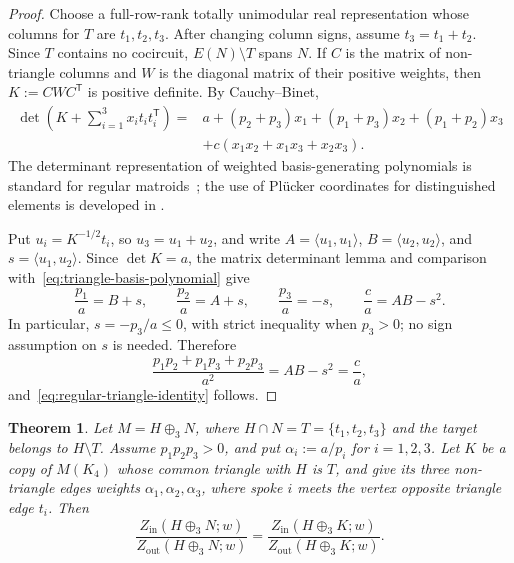 \documentclass[11pt]{article}
\numberwithin{equation}{section}
\newtheorem{theorem}[definition]{Theorem}
\theoremstyle{remark}
\begin{document}
\begin{proof}
Choose a full-row-rank totally unimodular real representation whose columns for $T$ are
$t_1,t_2,t_3$. After changing column signs, assume $t_3=t_1+t_2$. Since $T$
contains no cocircuit, $E(N)\setminus T$ spans $N$. If $C$ is the matrix of
non-triangle columns and $W$ is the diagonal matrix of their positive
weights, then $K:=CWC^{\mathsf T}$ is positive definite. By Cauchy--Binet,
\begin{equation}
\begin{aligned}
    \det\!\left(K+\sum_{i=1}^3x_it_it_i^{\mathsf T}\right)
    ={}&a
      +(p_2+p_3)x_1+(p_1+p_3)x_2+(p_1+p_2)x_3\\
     &+c(x_1x_2+x_1x_3+x_2x_3).
    \label{eq:triangle-basis-polynomial}
\end{aligned}
\end{equation}
The determinant representation of weighted basis-generating polynomials is
standard for regular matroids~\cite{ChoeOxleySokalWagner2004}; the use of
Pl\"ucker coordinates for distinguished elements is developed in
\cite{Chaiken2006PortedTutte}.

Put $u_i=K^{-1/2}t_i$, so $u_3=u_1+u_2$, and write
$A=\langle u_1,u_1\rangle$, $B=\langle u_2,u_2\rangle$, and
$s=\langle u_1,u_2\rangle$. Since $\det K=a$, the matrix determinant lemma
and comparison with~\eqref{eq:triangle-basis-polynomial} give
\begin{equation}
    \frac{p_1}{a}=B+s,
    \qquad
    \frac{p_2}{a}=A+s,
    \qquad
    \frac{p_3}{a}=-s,
    \qquad
    \frac{c}{a}=AB-s^2.
\end{equation}
In particular, $s=-p_3/a\leq0$, with strict inequality when $p_3>0$;
no sign assumption on $s$ is needed. Therefore
\begin{equation}
    \frac{p_1p_2+p_1p_3+p_2p_3}{a^2}
    =AB-s^2
    =\frac ca,
\end{equation}
and~\eqref{eq:regular-triangle-identity} follows.
\end{proof}

\begin{theorem}
\label{thm:seymour-three-sum}
Let $M=H\oplus_3N$, where $H\cap N=T=\{t_1,t_2,t_3\}$ and the target
belongs to $H\setminus T$. Assume $p_1p_2p_3>0$, and put
$\alpha_i:=a/p_i$ for $i=1,2,3$. Let $K$ be a copy of $M(K_4)$ whose common
triangle with $H$ is $T$, and give its three non-triangle edges weights
$\alpha_1,\alpha_2,\alpha_3$, where spoke $i$ meets the vertex opposite
triangle edge $t_i$. Then
\begin{equation}
    \frac{Z_{\mathrm{in}}(H\oplus_3N;w)}
         {Z_{\mathrm{out}}(H\oplus_3N;w)}
    =
    \frac{Z_{\mathrm{in}}(H\oplus_3K;w)}
         {Z_{\mathrm{out}}(H\oplus_3K;w)}.
    \label{eq:seymour-three-sum-ratio}
\end{equation}
\end{theorem}
\end{document}
